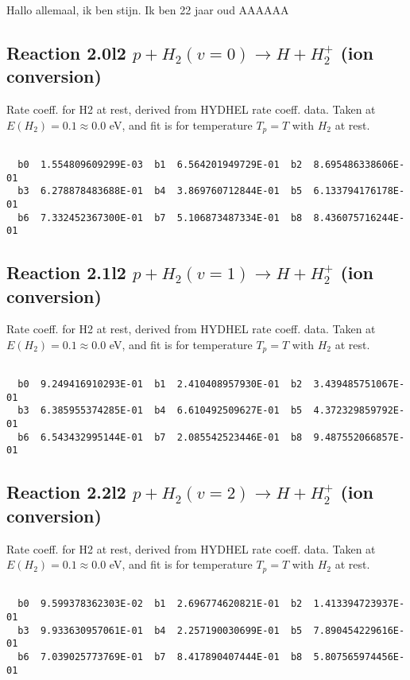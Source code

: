 Hallo allemaal, ik ben stijn. 
Ik ben 22 jaar oud
AAAAAA

\subsection{
Reaction 2.0l2
$ p + H_2(v=0) \rightarrow H + H_2^+$ (ion conversion)
}
Rate coeff. for H2 at rest, derived from HYDHEL rate coeff. data.
Taken at $E(H_2) = 0.1 \approx 0.0$ eV,  and fit is for temperature $T_p=T$ with $H_2$ at rest.

\begin{small}\begin{verbatim}

  b0  1.554809609299E-03  b1  6.564201949729E-01  b2  8.695486338606E-01
  b3  6.278878483688E-01  b4  3.869760712844E-01  b5  6.133794176178E-01
  b6  7.332452367300E-01  b7  5.106873487334E-01  b8  8.436075716244E-01

\end{verbatim}\end{small}

\newpage
\subsection{
Reaction 2.1l2
$ p + H_2(v=1) \rightarrow H + H_2^+$ (ion conversion)
}
Rate coeff. for H2 at rest, derived from HYDHEL rate coeff. data.
Taken at $E(H_2) = 0.1 \approx 0.0$ eV,  and fit is for temperature $T_p=T$ with $H_2$ at rest.

\begin{small}\begin{verbatim}

  b0  9.249416910293E-01  b1  2.410408957930E-01  b2  3.439485751067E-01
  b3  6.385955374285E-01  b4  6.610492509627E-01  b5  4.372329859792E-01
  b6  6.543432995144E-01  b7  2.085542523446E-01  b8  9.487552066857E-01

\end{verbatim}\end{small}

\newpage
\subsection{
Reaction 2.2l2
$ p + H_2(v=2) \rightarrow H + H_2^+$ (ion conversion)
}
Rate coeff. for H2 at rest, derived from HYDHEL rate coeff. data.
Taken at $E(H_2) = 0.1 \approx 0.0$ eV,  and fit is for temperature $T_p=T$ with $H_2$ at rest.

\begin{small}\begin{verbatim}

  b0  9.599378362303E-02  b1  2.696774620821E-01  b2  1.413394723937E-01
  b3  9.933630957061E-01  b4  2.257190030699E-01  b5  7.890454229616E-01
  b6  7.039025773769E-01  b7  8.417890407444E-01  b8  5.807565974456E-01

\end{verbatim}\end{small}

